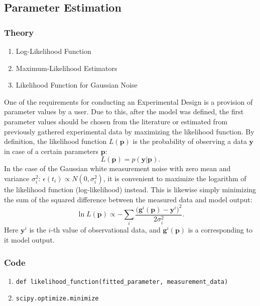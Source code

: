 \documentclass[10pt,A4paper]{article}
\newcommand{\mbp}{\mathbf{p}}
\newcommand{\mby}{\mathbf{y}}
\begin{document}
\subsection*{Parameter Estimation}
\subsubsection*{Theory}
\begin{enumerate}
    \item Log-Likelihood Function
    \item Maximum-Likelihood Estimators
    \item Likelihood Function for Gaussian Noise
\end{enumerate}

One of the requirements for conducting an Experimental Design is a provision of parameter values by a user.
Due to this, after the model was defined, the first parameter values should be chosen from the literature or estimated from previously gathered experimental data by maximizing the likelihood function.
By definition, the likelihood function $L(\mbp)$ is the probability of observing a data $\mby$ in case of a certain parameters $\mbp$:
\begin{equation}
    L(\mbp) = p(\mby|\mbp).
    \label{eq:likelihood_definition}
\end{equation}
In the case of the Gaussian white measurement noise with zero mean and variance $\sigma_i^2$: $\epsilon(t_i) \propto N(0, \sigma_i^2)$, it is convenient to maximize the logarithm of the likelihood function (log-likelihood) instead.
This is likewise simply minimizing the sum of the squared difference between the measured data and model output:
\begin{equation}
    \ln L(\mbp) \propto - \sum_{i}\frac{ \big(\mathbf{g}^{i}(\mbp) - \mby^{i}\big)^2}{2 \sigma_{i}^2}.
    \label{eq:likelihood_Gaussian}
\end{equation}
Here $\mby^{i}$ is the $i$-th value of observational data, and $\mathbf{g}^{i}(\mbp)$ is a corresponding to it model output.

\subsubsection*{Code}
\begin{enumerate}
    \item \texttt{def likelihood_function(fitted_parameter, measurement_data)}
    \item \texttt{scipy.optimize.minimize}
\end{enumerate}
%
\end{document}
